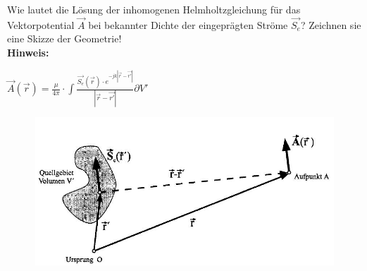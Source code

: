 \begin{question}[section=11,name={Helmholtz},difficulty=,quantity=,type=thr,tags={}]
	Wie lautet die Lösung der inhomogenen Helmholtzgleichung für das Vektorpotential $\vec{A}$ bei bekannter Dichte der eingeprägten Ströme $\vec{S_e}$? Zeichnen sie eine Skizze der Geometrie!
	\\ \textbf{Hinweis:}\\
	
\end{question}
\begin{solution}
	$\vec{A}(\vec{r}) = \frac{\mu}{4 \pi} \cdot \int{\frac{\vec{S_e}(\vec{r})\cdot e^{-jk|\vec{r}- \vec{r'}|}}{|\vec{r}- \vec{r'}|} \partial V'}$ \\
	\begin{figure}[H]
		\includegraphics[width=14cm]{./opn/exm/thr/chp/11/5/bild.jpeg}
	\end{figure}
\end{solution}